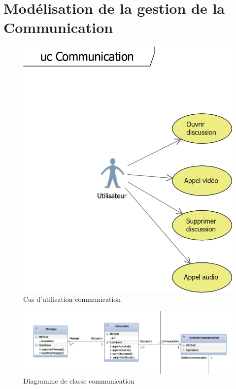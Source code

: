 \documentclass[11pt]{article}
\begin{document}
\section{Modélisation de la gestion de la Communication}
\begin{figure}[!h]
        \centering \includegraphics[scale=1]{ucCom.png}
        \caption{Cas d'utilisation communication}
         \label{fig:ucCom}
\end{figure}
\begin{figure}[!h]
        \centering \includegraphics[scale=1]{com.png}
        \caption{Diagramme de classe communication}
         \label{fig:com}
\end{figure}

\newpage
\end{document}

